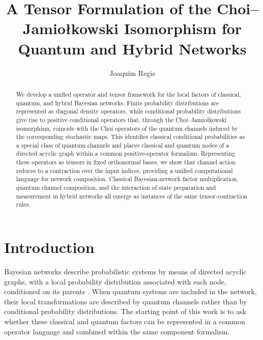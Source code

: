 \documentclass[
    aps,
    pra,
    reprint,
    superscriptaddress,
    nofootinbib
]{revtex4-2}
\theoremstyle{definition}
\theoremstyle{plain}
\begin{document}
\title{A Tensor Formulation of the Choi--Jamio{\l}kowski Isomorphism for
Quantum and Hybrid Networks}
\author{Joaquim Regis}
\begin{abstract}
We develop a unified operator and tensor framework for the local factors of
classical, quantum, and hybrid Bayesian networks. Finite probability
distributions are represented as diagonal density operators, while
conditional probability distributions give rise to positive conditional
operators that, through the Choi--Jamio{\l}kowski isomorphism, coincide with
the Choi operators of the quantum channels induced by the corresponding
stochastic maps. This identifies classical conditional probabilities as a
special class of quantum channels and places classical and quantum nodes of
a directed acyclic graph within a common positive-operator formalism.
Representing these operators as tensors in fixed orthonormal bases, we
show that channel action reduces to a contraction over the input indices,
providing a unified computational language for network composition.
Classical Bayesian-network factor multiplication, quantum channel
composition, and the interaction of state preparation and measurement in
hybrid networks all emerge as instances of the same tensor-contraction
rules.
\end{abstract}

\maketitle


\section{Introduction}

Bayesian networks describe probabilistic systems by means of directed
acyclic graphs, with a local probability distribution associated with each
node, conditioned on its parents
\cite[Sec.~11.2.3]{Darwiche2008}. When quantum systems are included in the
network, their local transformations are described by quantum channels
rather than by conditional probability distributions. The starting point
of this work is to ask whether these classical and quantum factors can be
represented in a common operator language and combined within the same
component formalism.
\end{document}
